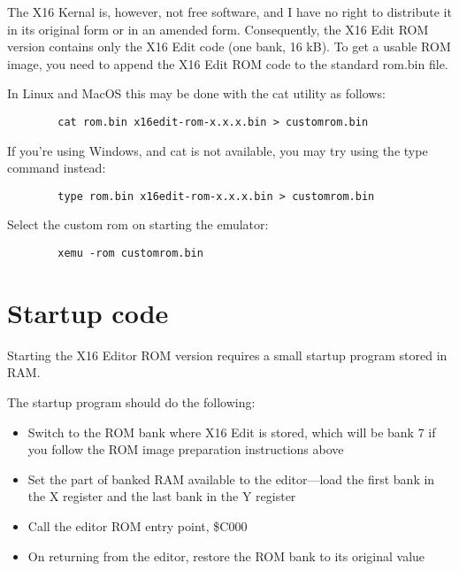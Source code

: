 \documentclass{article}
\begin{document}
    The X16 Kernal is, however, not free software, and I have no right to distribute it in its
    original form or in an amended form. Consequently, the X16 Edit ROM version contains only the X16 Edit code (one bank, 16 kB). To get a 
    usable ROM image, you need to append the X16 Edit ROM code to the standard
    rom.bin file.

    In Linux and MacOS this may be done with the cat utility as follows: 
    
    \begin{verbatim}
        cat rom.bin x16edit-rom-x.x.x.bin > customrom.bin
    \end{verbatim}

    If you're using Windows, and cat is not available, you may try using the type command instead:
    
    \begin{verbatim}
        type rom.bin x16edit-rom-x.x.x.bin > customrom.bin
    \end{verbatim}

    Select the custom rom on starting the emulator: 
    
    \begin{verbatim}
        xemu -rom customrom.bin
    \end{verbatim}

\section{Startup code}

    Starting the X16 Editor ROM version requires a small startup program stored in RAM.

    The startup program should do the following:

    \begin{itemize}
        \item Switch to the ROM bank where X16 Edit is stored, which will be bank 7 if you follow the ROM image preparation instructions above

        \item Set the part of banked RAM available to the editor---load the first bank in the X register and the last bank in the Y register

        \item Call the editor ROM entry point, \$C000

        \item On returning from the editor, restore the ROM bank to its original value
    \end{itemize}
\end{document}
